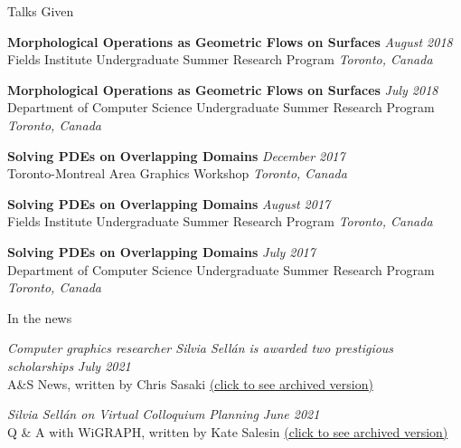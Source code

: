 \documentclass{resume}
\newcommand{\talk}[4]{
    {\bf #1} \hfill {\em \small #2} \\ %
    {\small #3} \hfill {\em \small #4}
}
\begin{document}
\begin{rSection}{Talks Given}
\talk{Morphological Operations as Geometric Flows on Surfaces}{August 2018}
{Fields Institute Undergraduate Summer Research Program}{Toronto, Canada}

\talk{Morphological Operations as Geometric Flows on Surfaces}{July 2018}
{Department of Computer Science Undergraduate Summer Research Program}{Toronto, Canada}

\talk{Solving PDEs on Overlapping Domains}{December 2017}
{Toronto-Montreal Area Graphics Workshop}{Toronto, Canada}

\talk{Solving PDEs on Overlapping Domains}{August 2017}
{Fields Institute Undergraduate Summer Research Program}{Toronto, Canada}

\talk{Solving PDEs on Overlapping Domains}{July 2017}
{Department of Computer Science Undergraduate Summer Research Program}{Toronto, Canada}

\end{rSection}

\begin{rSection}{In the news}


{\it Computer graphics researcher Silvia Sellán is awarded two prestigious scholarships} \hfill {\small \it July 2021}\\ 
{\small A\&S News, written by Chris Sasaki \href{https://web.cs.toronto.edu/news-events/news/silvia-sellan-scholarships}{(click to see archived version)}} 

{\it Silvia Sellán on Virtual Colloquium Planning} \hfill {\small \it June 2021}\\ 
{\small Q \& A with WiGRAPH, written by Kate Salesin \href{https://www.wigraph.org/spotlights/silvia-sellan-on-virtual-colloquium-planning/}{(click to see archived version)}} 

\end{rSection}
\end{document}
